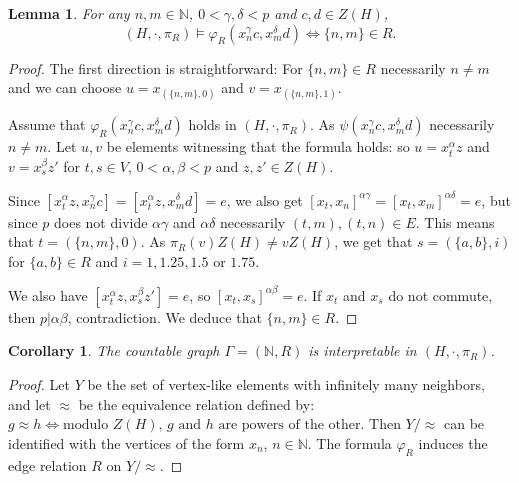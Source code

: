 \documentclass[11pt]{amsart}
\theoremstyle{plain}
\newtheorem{corollary}[theorem]{Corollary}
\newtheorem{lemma}[theorem]{Lemma}
\theoremstyle{definition}
\theoremstyle{remark}
\newtheorem{remark}[theorem]{Remark}
\numberwithin{equation}{section}
\begin{document}
\begin{lemma}
    For any $n, m\in \mathbb{N}$, $0<\gamma,\delta<p$ and $c,d\in Z(H)$, \[(H,\cdot ,\pi_R)\models \varphi_R(x_n^\gamma c,x_m^\delta d)\iff \{n,m\}\in R.\]
\end{lemma}
\begin{proof}
    The first direction is straightforward: For $\{n,m\}\in R$ necessarily $n\neq m$ and we can choose $u=x_{(\{n,m\},0)}$ and $v=x_{(\{n,m\},1)}$.

    Assume that $\varphi_R(x_n^\gamma c,x_m^\delta d)$ holds in $(H,\cdot ,\pi_R)$. As $\psi(x_n^\gamma c,x_m^\delta d)$ necessarily $n\neq m$. Let $u,v$ be elements witnessing that the formula holds: so $u=x_t^{\alpha}z$ and $v=x_s^{\beta}z'$ for $t,s\in V$, $0< \alpha,\beta< p$ and $z,z'\in Z(H)$. 

    Since $[x_t^{\alpha}z,x_n^\gamma c]=[x_t^{\alpha}z,x_m^\delta d]=e$, we also get $[x_t,x_n]^{\alpha \gamma}=[x_t,x_m]^{\alpha \delta}=e$, but since $p$ does not divide $\alpha\gamma$ and $\alpha\delta$ necessarily $(t,m),(t,n)\in E$. This means that $t=(\{n,m\},0)$. As $\pi_R(v)Z(H)\neq vZ(H)$, we get that $s=(\{a,b\},i)$ for $\{a,b\}\in R$ and $i=1,1.25,1.5$ or $1.75$. 
    
    We also have $[x_t^{\alpha}z,x_s^{\beta}z']=e$, so $[x_t,x_s]^{\alpha\beta}=e$. If $x_t$ and $x_s$ do not commute, then  $p|\alpha\beta$, contradiction. We deduce that $\{n,m\}\in R$.
\end{proof}

\begin{corollary}\label{C: up interpret any countable graph}
  The countable graph $\Gamma=(\mathbb{N},R)$ is interpretable in  $(H,\cdot,\pi_R)$.
\end{corollary}
\begin{proof}
 Let $Y$ be the set of vertex-like elements with infinitely many neighbors, and let $\approx$ be the equivalence relation defined by: $g\approx h \iff \text{modulo $Z(H)$,  $g$ and $h$ are powers of the other}$. Then $Y/\approx$ can be identified with the vertices of the form $x_n$, $n\in \mathbb{N}$. The formula $\varphi_R$ induces the edge relation $R$ on $Y/\approx$.    
\end{proof}

 
\end{document}
